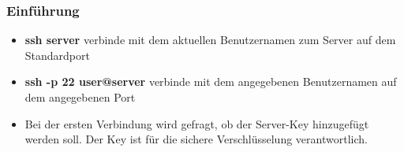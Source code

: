 \begin{frame}
\frametitle{Einführung}
\begin{itemize}
\item \textbf{ssh server} verbinde mit dem aktuellen Benutzernamen zum Server auf dem Standardport
\pause
\item \textbf{ssh -p 22 user@server} verbinde mit dem angegebenen Benutzernamen auf dem angegebenen Port
\pause
\item Bei der ersten Verbindung wird gefragt, ob der Server-Key hinzugefügt werden soll. Der Key ist für die sichere Verschlüsselung verantwortlich.
\end{itemize}
\end{frame}